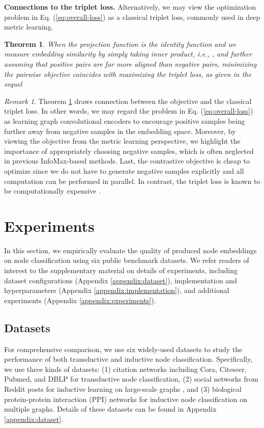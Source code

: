\documentclass{article}
\newtheorem{theorem}{Theorem}[section]
\theoremstyle{remark}
\newtheorem*{remark}{Remark}
\begin{document}
\textbf{Connections to the triplet loss.\quad}
Alternatively, we may view the optimization problem in Eq. (\ref{eq:overall-loss}) as a classical triplet loss, commonly used in deep metric learning.
\begin{theorem}
\label{thm:objective-triplet-loss}
When the projection function  is the identity function and we measure embedding similarity by simply taking inner product, i.e., , and further assuming that positive pairs are far more aligned than negative pairs, minimizing the pairwise objective  coincides with maximizing the triplet loss, as given in the sequel

\end{theorem}
\begin{remark}
Theorem \ref{thm:objective-triplet-loss} draws connection between the objective and the classical triplet loss.
In other words, we may regard the problem in Eq. (\ref{eq:overall-loss}) as learning graph convolutional encoders to encourage positive samples being further away from negative samples in the embedding space. Moreover, by viewing the objective from the metric learning perspective, we highlight the importance of appropriately choosing negative samples, which is often neglected in previous InfoMax-based methods. Last, the contrastive objective is cheap to optimize since we do not have to generate negative samples explicitly and all computation can be performed in parallel. In contrast, the triplet loss is known to be computationally expensive \cite{Schroff:2015wo}.
\end{remark}
 \section{Experiments}

In this section, we empirically evaluate the quality of produced node embeddings on node classification using six public benchmark datasets.
We refer readers of interest to the supplementary material on details of experiments, including dataset configurations (Appendix \ref{appendix:dataset}), implementation and hyperparameters (Appendix \ref{appendix:implementation}), and additional experiments (Appendix \ref{appendix:experiments}).

\subsection{Datasets}

For comprehensive comparison, we use six widely-used datasets to study the performance of both transductive and inductive node classification. Specifically, we use three kinds of datasets:
(1) citation networks including Cora, Citeseer, Pubmed, and DBLP \cite{Sen:2008gm,Bojchevski:2018ua} for transductive node classification,
(2) social networks from Reddit posts for inductive learning on large-scale graphs \cite{Hamilton:2017tp},
and (3) biological protein-protein interaction (PPI) networks \cite{Zitnik:2017uz} for inductive node classification on multiple graphs.
Details of these datasets can be found in Appendix \ref{appendix:dataset}.
\end{document}

